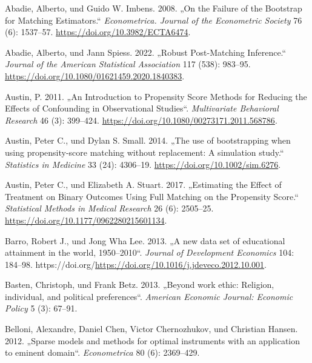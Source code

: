 \documentclass[
  a4paper,
  DIV=11,
  oneside]{scrreprt}
\newlength{\cslhangindent}
\newlength{\cslentryspacingunit} %
\newenvironment{CSLReferences}[2] %
 {%
  \setlength{\parindent}{0pt}
  \ifodd #1
  \let\oldpar\par
  \def\par{\hangindent=\cslhangindent\oldpar}
  \fi
  \setlength{\parskip}{#2\cslentryspacingunit}
 }%
 {}
\begin{document}
\hypertarget{refs}{}
\begin{CSLReferences}{1}{0}
\leavevmode{}%
Abadie, Alberto, und Guido W. Imbens. 2008. {„On the Failure of the
Bootstrap for Matching Estimators.``} \emph{Econometrica. Journal of the
Econometric Society} 76 (6): 1537--57.
\url{https://doi.org/10.3982/ECTA6474}.

\leavevmode{}%
Abadie, Alberto, und Jann Spiess. 2022. {„Robust Post-Matching
Inference.``} \emph{Journal of the American Statistical Association} 117
(538): 983--95. \url{https://doi.org/10.1080/01621459.2020.1840383}.

\leavevmode{}%
Austin, P. 2011. {„An Introduction to Propensity Score Methods for
Reducing the Effects of Confounding in Observational Studies``}.
\emph{Multivariate Behavioral Research} 46 (3): 399--424.
\url{https://doi.org/10.1080/00273171.2011.568786}.

\leavevmode{}%
Austin, Peter C., und Dylan S. Small. 2014. {„The use of bootstrapping
when using propensity-score matching without replacement: A simulation
study.``} \emph{Statistics in Medicine} 33 (24): 4306--19.
\url{https://doi.org/10.1002/sim.6276}.

\leavevmode{}%
Austin, Peter C., und Elizabeth A. Stuart. 2017. {„Estimating the Effect
of Treatment on Binary Outcomes Using Full Matching on the Propensity
Score.``} \emph{Statistical Methods in Medical Research} 26 (6):
2505--25. \url{https://doi.org/10.1177/0962280215601134}.

\leavevmode{}%
Barro, Robert J., und Jong Wha Lee. 2013. {„A new data set of
educational attainment in the world, 1950--2010``}. \emph{Journal of
Development Economics} 104: 184--98.
https://doi.org/\url{https://doi.org/10.1016/j.jdeveco.2012.10.001}.

\leavevmode{}%
Basten, Christoph, und Frank Betz. 2013. {„Beyond work ethic: Religion,
individual, and political preferences``}. \emph{American Economic
Journal: Economic Policy} 5 (3): 67--91.

\leavevmode{}%
Belloni, Alexandre, Daniel Chen, Victor Chernozhukov, und Christian
Hansen. 2012. {„Sparse models and methods for optimal instruments with
an application to eminent domain``}. \emph{Econometrica} 80 (6):
2369--429.


\end{CSLReferences}
\end{document}
